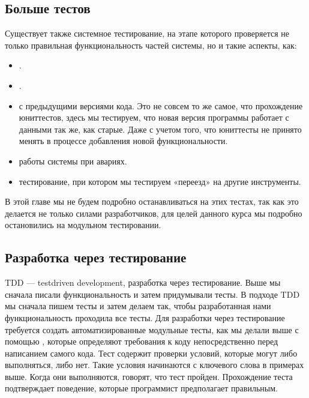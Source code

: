 \documentclass[letterpaper,10pt,russian]{sphinxmanual}
\begin{document}
\subsection{Больше тестов}
\label{\detokenize{educational_materials/testing/content:id8}}
\sphinxAtStartPar
Существует также системное тестирование, на этапе которого проверяется не только правильная функциональность частей системы, но и такие аспекты, как:
\begin{itemize}
\item {} 
\sphinxAtStartPar
{}.

\item {} 
\sphinxAtStartPar
{}.

\item {} 
\sphinxAtStartPar
{} с предыдущими версиями кода. Это не совсем то же самое, что прохождение юнит\sphinxhyphen{}тестов, здесь мы тестируем, что новая версия программы работает с данными так же, как старые. Даже с учетом того, что юнит\sphinxhyphen{}тесты не принято менять в процессе добавления новой функциональности.

\item {} 
\sphinxAtStartPar
{} работы системы при авариях.

\item {} 
\sphinxAtStartPar
{} тестирование, при котором мы тестируем «переезд» на другие инструменты.

\end{itemize}

\sphinxAtStartPar
В этой главе мы не будем подробно останавливаться на этих тестах, так как это делается не только силами разработчиков, для целей данного курса мы подробно остановились на модульном тестировании.


\subsection{Разработка через тестирование}
\label{\detokenize{educational_materials/testing/content:id9}}
\sphinxAtStartPar
TDD — test\sphinxhyphen{}driven development, разработка через тестирование. Выше мы сначала писали функциональность и затем придумывали тесты. В подходе TDD мы сначала пишем тесты и затем делаем так, чтобы разработанная нами функциональность проходила все тесты. Для разработки через тестирование требуется создать автоматизированные модульные тесты, как мы делали выше с помощью , которые определяют требования к коду непосредственно перед написанием самого кода. Тест содержит проверки условий, которые могут либо выполняться, либо нет. Такие условия начинаются с ключевого слова  в примерах выше. Когда они выполняются, говорят, что тест пройден. Прохождение теста подтверждает поведение, которые программист предполагает правильным.
\end{document}
